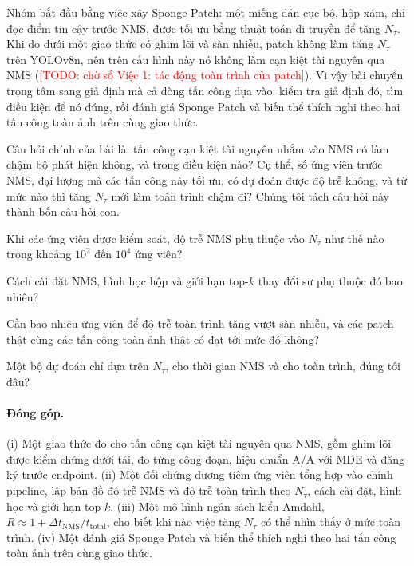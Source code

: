\documentclass[12pt,a4paper]{article}
\newcommand{\todo}[1]{\textcolor{red}{[TODO: #1]}}
\newcommand{\Ntau}{N_{\tau}}
\begin{document}
Nhóm bắt đầu bằng việc xây Sponge Patch: một miếng dán cục bộ, hộp xám, chỉ đọc điểm tin cậy trước NMS, được tối ưu bằng thuật toán di truyền để tăng $\Ntau$. Khi đo dưới một giao thức có ghim lõi và sàn nhiễu, patch không làm tăng $\Ntau$ trên YOLOv8n, nên trên cấu hình này nó không làm cạn kiệt tài nguyên qua NMS (\todo{chờ số Việc 1: tác động toàn trình của patch}). Vì vậy bài chuyển trọng tâm sang giả định mà cả dòng tấn công dựa vào: kiểm tra giả định đó, tìm điều kiện để nó đúng, rồi đánh giá Sponge Patch và biến thể thích nghi theo hai tấn công toàn ảnh trên cùng giao thức.

Câu hỏi chính của bài là: tấn công cạn kiệt tài nguyên nhắm vào NMS có làm chậm bộ phát hiện không, và trong điều kiện nào? Cụ thể, số ứng viên trước NMS, đại lượng mà các tấn công này tối ưu, có dự đoán được độ trễ không, và từ mức nào thì tăng $\Ntau$ mới làm toàn trình chậm đi? Chúng tôi tách câu hỏi này thành bốn câu hỏi con.
\begin{description}[leftmargin=2.5em,labelwidth=2.2em,itemsep=2pt]
\item[Q1] Khi các ứng viên được kiểm soát, độ trễ NMS phụ thuộc vào $\Ntau$ như thế nào trong khoảng $10^2$ đến $10^4$ ứng viên?
\item[Q2] Cách cài đặt NMS, hình học hộp và giới hạn top-$k$ thay đổi sự phụ thuộc đó bao nhiêu?
\item[Q3] Cần bao nhiêu ứng viên để độ trễ toàn trình tăng vượt sàn nhiễu, và các patch thật cùng các tấn công toàn ảnh thật có đạt tới mức đó không?
\item[Q4] Một bộ dự đoán chỉ dựa trên $\Ntau$, cho thời gian NMS và cho toàn trình, đúng tới đâu?
\end{description}

\paragraph{Đóng góp.}
(i) Một giao thức đo cho tấn công cạn kiệt tài nguyên qua NMS, gồm ghim lõi được kiểm chứng dưới tải, đo từng công đoạn, hiệu chuẩn A/A với MDE và đăng ký trước endpoint. (ii) Một đối chứng dương tiêm ứng viên tổng hợp vào chính pipeline, lập bản đồ độ trễ NMS và độ trễ toàn trình theo $\Ntau$, cách cài đặt, hình học và giới hạn top-$k$. (iii) Một mô hình ngân sách kiểu Amdahl, $R \approx 1 + \Delta t_{\mathrm{NMS}}/t_{\mathrm{total}}$, cho biết khi nào việc tăng $\Ntau$ có thể nhìn thấy ở mức toàn trình. (iv) Một đánh giá Sponge Patch và biến thể thích nghi theo hai tấn công toàn ảnh trên cùng giao thức.
\end{document}
